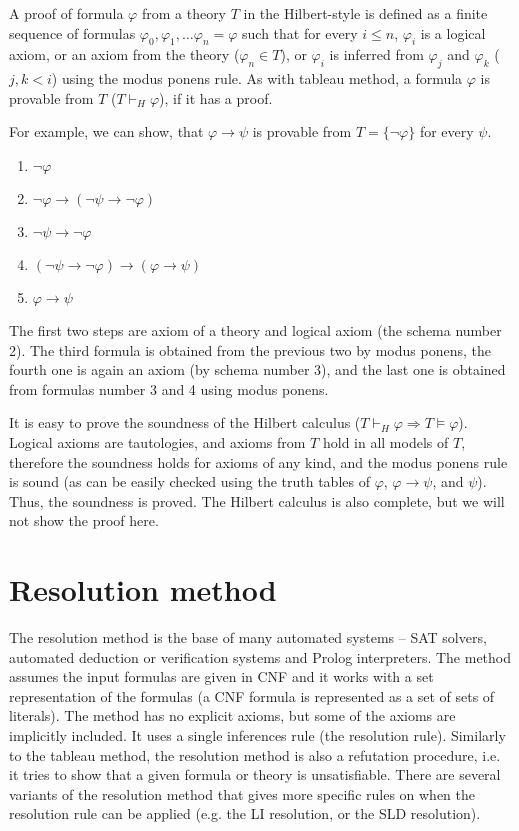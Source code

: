 A proof of formula $\varphi$ from a theory $T$ in the Hilbert-style is defined as a finite sequence of formulas $\varphi_0, \varphi_1, \dots \varphi_n = \varphi$ such that for every $i \leq n$, $\varphi_i$ is a logical axiom, or an axiom from the theory ($\varphi_n \in T$), or $\varphi_i$ is inferred from $\varphi_j$ and $\varphi_k$ ($j,k < i$) using the modus ponens rule. As with tableau method, a formula $\varphi$ is provable from $T$ ($T \vdash_H \varphi$), if it has a proof.

For example, we can show, that $\varphi \to \psi$ is provable from $T = \{\neg \varphi\}$ for every $\psi$.

\begin{enumerate}
\item $\neg \varphi$
\item $\neg \varphi \to (\neg \psi \to \neg \varphi)$
\item $\neg \psi \to \neg \varphi$
\item $(\neg \psi \to \neg \varphi) \to (\varphi \to \psi)$
\item $\varphi \to \psi$
\end{enumerate}

The first two steps are axiom of a theory and logical axiom (the schema number 2). The third formula is obtained from the previous two by modus ponens, the fourth one is again an axiom (by schema number 3), and the last one is obtained from formulas number 3 and 4 using modus ponens.

It is easy to prove the soundness of the Hilbert calculus ($T \vdash_H \varphi \Rightarrow T \vDash \varphi$). Logical axioms are tautologies, and axioms from $T$ hold in all models of $T$, therefore the soundness holds for axioms of any kind, and the modus ponens rule is sound (as can be easily checked using the truth tables of $\varphi$, $\varphi \to \psi$, and $\psi$). Thus, the soundness is proved. The Hilbert calculus is also complete, but we will not show the proof here.

\section{Resolution method}

The resolution method is the base of many automated systems -- SAT solvers, automated deduction or verification systems and Prolog interpreters. The method assumes the input formulas are given in CNF and it works with a set representation of the formulas (a CNF formula is represented as a set of sets of literals). The method has no explicit axioms, but some of the axioms are implicitly included. It uses a single inferences rule (the resolution rule). Similarly to the tableau method, the resolution method is also a refutation procedure, i.e. it tries to show that a given formula or theory is unsatisfiable. There are several variants of the resolution method that gives more specific rules on when the resolution rule can be applied (e.g. the LI resolution, or the SLD resolution).

